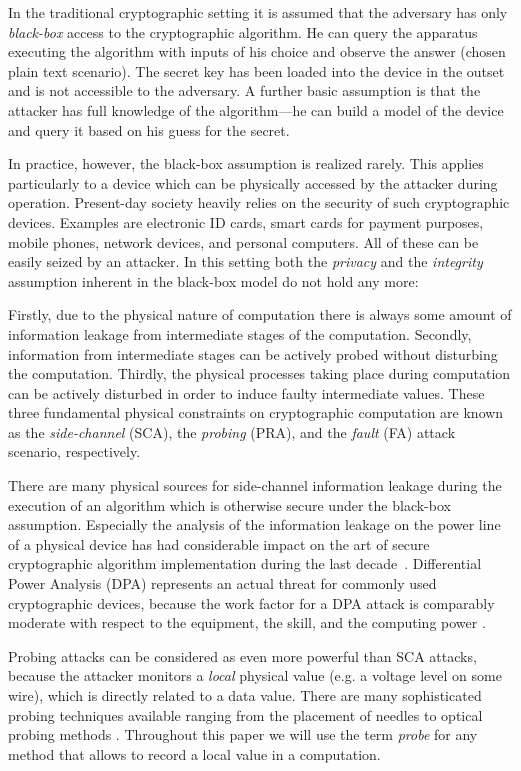 \documentclass[11pt]{llncs}
\begin{document}
In the traditional cryptographic setting it is assumed that
the adversary has only \emph{black-box} access to the cryptographic algorithm.
He can query the apparatus executing
the algorithm with inputs of his choice and
observe the answer (chosen plain text scenario).
The secret key has been loaded into
the device in the outset and is not accessible to the adversary.
A further basic assumption is that the attacker has full knowledge of
the algorithm---he can build a model of the device
and query it based on his guess for the secret.

In practice, however, the black-box assumption is realized rarely.
This applies particularly to a device which can be physically
accessed by the attacker during operation. Present-day society
heavily relies on the security of such cryptographic devices.
Examples are electronic ID cards, smart cards for payment purposes,
mobile phones, network devices, and personal computers. All of these
can be easily seized by an attacker. In this setting both the
\emph{privacy} and the \emph{integrity} assumption inherent in the
black-box model do not hold any more:

Firstly, due to the physical nature of computation there is always
some amount of information leakage from intermediate stages of the computation.
Secondly, information from intermediate stages can be actively probed
without disturbing the computation.
Thirdly, the physical processes taking place during computation
can be actively disturbed in order to induce faulty intermediate values.
These three fundamental physical constraints on cryptographic computation
are known as
the \emph{side-channel} (SCA),
the \emph{probing} (PRA), and
the \emph{fault} (FA)
attack scenario, respectively.

There are many physical sources for side-channel information
leakage during the execution of an algorithm
which is otherwise secure under the black-box assumption.
Especially the analysis of the information leakage on
the power line of a physical device has had considerable
impact on the art of secure cryptographic algorithm implementation
during the last decade~\cite{Kocher1999DifferentialPowerAnalysis}.
Differential Power Analysis (DPA) represents an actual threat
for commonly used cryptographic devices, because the
work factor for a DPA attack is comparably moderate
with respect to the equipment, the skill, and the computing power
\cite{Chari1999TowardsSoundApproaches,Mangard2007PowerAnalysisAttacks,Messerges2000SecuringtheAES}.

Probing attacks can be considered as even more powerful
than SCA attacks, because the attacker
monitors a \emph{local} physical value (e.g. a voltage level on some wire),
which is directly related to a data value.
There are many sophisticated probing techniques available
ranging from the placement of needles to optical probing methods
\cite{Anderson1996TamperResistance-,Boit2008PhysicalTechniquesChip-Backside}.
Throughout this paper we will use the term \emph{probe}
for any method that allows to record
a local value in a computation.
\end{document}
